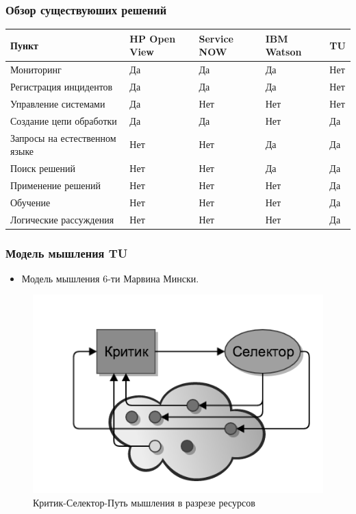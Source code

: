 \documentclass[14pt]{beamer}
\begin{document}
\begin{frame}
\frametitle{Обзор существуюших решений}
\begin{table}
	
\small
\begin{tabular} {|p{5cm}|p{1cm}|p{1cm}|p{1cm}|p{1cm}|}

\hline
\textbf{Пункт} & HP Open View & Service NOW & IBM Watson & TU\\
\hline
   Мониторинг & Да & Да & Да & Нет \\
   \hline
   Регистрация инцидентов & Да & Да & Да & Нет\\
   \hline
   Управление системами & Да & Нет & Нет & Нет \\
   \hline 
   Создание цепи обработки & Да & Да & Нет & Да \\
   \hline 
   Запросы на естественном языке & Нет & Нет & Да & Да\\
   \hline 
   Поиск решений & Нет & Нет & Да & Да\\
   \hline 
   Применение решений & Нет & Нет & Нет & Да \\
   \hline
   Обучение & Нет & Нет & Нет & Да \\
   \hline
   Логические рассуждения & Нет & Нет & Нет & Да \\
   \hline
  
\end{tabular}
\end{table}
\end{frame}

\begin{frame}
\frametitle{Модель мышления TU}
	\begin{itemize}
		\item  Модель мышления 6-ти Марвина Мински.
	\end{itemize}
\begin{figure} [h] 
  \center
  \includegraphics [scale=0.6] {CSW_EX}
  \caption{Критик-Селектор-Путь мышления в разрезе ресурсов} 
  \label{img:csw_ex} 
\end{figure}
\end{frame}
\end{document}
